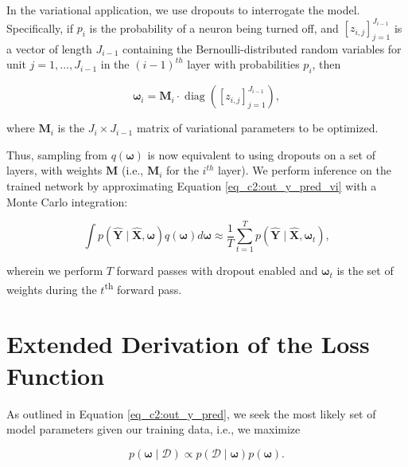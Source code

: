 In the variational application, we use dropouts to interrogate the model. 
Specifically, 
if $p_{i}$ is the probability of a neuron being turned off, and
$\left[z_{i, j}\right]_{j=1}^{J_{i-1}}$ is a vector of length $J_{i-1}$ containing the Bernoulli-distributed random variables for unit $j=1, \ldots, J_{i-1}$ in the $(i-1)^{th}$ layer with probabilities $p_i$, then

\begin{equation}
\boldsymbol{\omega}_{i} =\boldsymbol{M}_{i} \cdot \operatorname{diag}\left(\left[z_{i, j}\right]_{j=1}^{J_{i-1}}\right) ,
\label{eq_c2:bernoulli}
\end{equation}

\noindent
where $\boldsymbol{M}_i$ is the $J_i \times J_{i-1}$ matrix of variational parameters to be optimized. 

Thus, sampling from $q(\boldsymbol{\omega})$ is now equivalent to using dropouts on a set of layers, with weights $\boldsymbol{M}$ %
(i.e., $\boldsymbol{M}_i$ for the $i^{th}$ layer). 
We perform inference on the trained network by 
approximating Equation \ref{eq_c2:out_y_pred_vi} with a Monte Carlo integration: 

\begin{equation}
\int p(\boldsymbol{\hat{Y}} \mid \boldsymbol{\hat{X}}, \boldsymbol{\omega}) q(\boldsymbol{\omega}) d \boldsymbol{\omega} \approx \frac{1}{T} \sum_{t=1}^{T} p(\boldsymbol{\hat{Y}} \mid \boldsymbol{\hat{X}}, \boldsymbol{\omega}_t) ,
\end{equation}

\noindent
wherein we perform $T$ forward passes with dropout enabled and $\boldsymbol{\omega}_t$ is the set of weights during the $t$\textsuperscript{th} forward pass.

\section{Extended Derivation of the Loss Function} \label{sec_c2:ap:final_loss_deri}


As outlined in Equation \ref{eq_c2:out_y_pred}, we seek the most likely set of model parameters given our training data, %
i.e., we maximize 

\begin{equation}
p(\boldsymbol{\omega} \mid \mathcal{D}) \propto p(\mathcal{D} \mid \boldsymbol{\omega})p(\boldsymbol{\omega}) .
\label{eq_c2:bayes_rule}
\end{equation}

